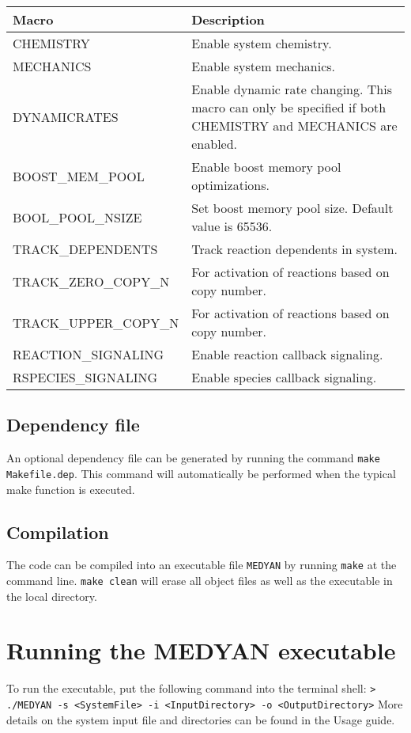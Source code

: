 \documentclass[11pt, oneside]{article}   	%
\begin{document}
\small
\begin{table} [!ht]
\centering
\begin{tabular}{|L{5cm}|L{9cm}|}  
\hline
 \textbf{Macro} & \textbf{Description} \\
 \hline
  CHEMISTRY & Enable system chemistry. \\
  \hline
  MECHANICS & Enable system mechanics. \\ 
  \hline
  DYNAMICRATES & Enable dynamic rate changing. This macro can only be specified if both CHEMISTRY and
  MECHANICS are enabled. \\
  \hline
  BOOST\_MEM\_POOL & Enable boost memory pool optimizations. \\
  \hline
   BOOL\_POOL\_NSIZE & Set boost memory pool size. Default value is 65536. \\
  \hline
   TRACK\_DEPENDENTS & Track reaction dependents in system. \\
  \hline
    TRACK\_ZERO\_COPY\_N & For activation of reactions based on copy number. \\
  \hline
     TRACK\_UPPER\_COPY\_N & For activation of reactions based on copy number. \\
  \hline
     REACTION\_SIGNALING & Enable reaction callback signaling. \\
  \hline
     RSPECIES\_SIGNALING & Enable species callback signaling.\\
  \hline
\end{tabular}
\end{table}
\normalsize

	
\subsection {Dependency file}

An optional dependency file can be generated by running the command  \texttt{make Makefile.dep}. This command will automatically be performed when the typical make function is executed.

\subsection{Compilation}

The code can be compiled into an executable file \texttt{MEDYAN} by running \texttt{make} at the command line. \texttt{make clean} will erase all object files as well as the executable in the local directory.

\section {Running the MEDYAN executable}

To run the executable, put the following command into the terminal shell: \newline \newline\indent \texttt{> ./MEDYAN -s <SystemFile> -i <InputDirectory> -o <OutputDirectory>} \newline \newline More details on the system input file and directories can be found in the Usage guide.
\end{document}

